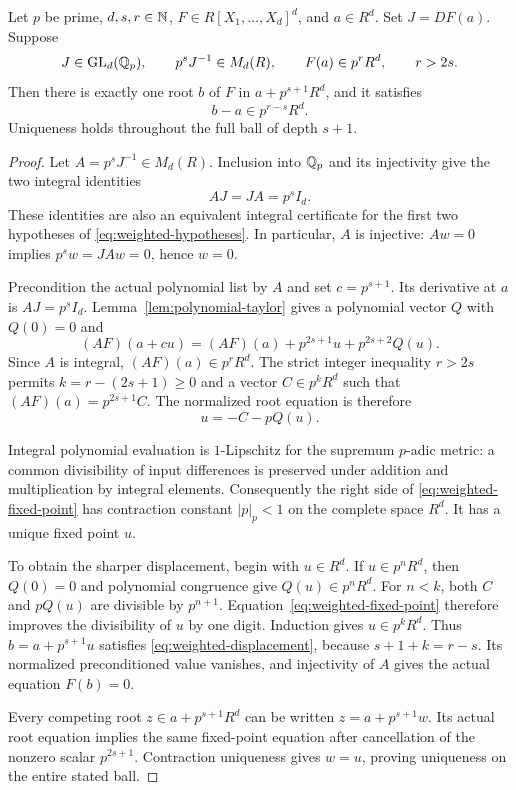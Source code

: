 \begin{theorem}\label{thm:weighted-lifting}
Let $p$ be prime, $d,s,r\in\mathbb N$, $F\in R[X_1,\ldots,X_d]^d$, and
$a\in R^d$. Set $J=DF(a)$. Suppose
\begin{equation}\label{eq:weighted-hypotheses}
 J\in\operatorname{GL}_d(\mathbb Q_p),\qquad
 p^sJ^{-1}\in M_d(R),\qquad F(a)\in p^rR^d,\qquad r>2s.
\end{equation}
Then there is exactly one root $b$ of $F$ in $a+p^{s+1}R^d$, and it
satisfies
\begin{equation}\label{eq:weighted-displacement}
 b-a\in p^{r-s}R^d.
\end{equation}
Uniqueness holds throughout the full ball of depth $s+1$.
\end{theorem}

\begin{proof}
Let $A=p^sJ^{-1}\in M_d(R)$. Inclusion into $\mathbb Q_p$ and its injectivity
give the two integral identities
\[
 AJ=JA=p^sI_d.
\]
These identities are also an equivalent integral certificate for the
first two hypotheses of \eqref{eq:weighted-hypotheses}. In particular,
$A$ is injective: $Aw=0$ implies $p^sw=JAw=0$, hence $w=0$.

Precondition the actual polynomial list by $A$ and set $c=p^{s+1}$.
Its derivative at $a$ is $AJ=p^sI_d$. Lemma~\ref{lem:polynomial-taylor}
gives a polynomial vector $Q$ with $Q(0)=0$ and
\[
 (AF)(a+cu)=(AF)(a)+p^{2s+1}u+p^{2s+2}Q(u).
\]
Since $A$ is integral, $(AF)(a)\in p^rR^d$. The strict integer inequality
$r>2s$ permits $k=r-(2s+1)\ge0$ and a vector $C\in p^kR^d$ such that
$(AF)(a)=p^{2s+1}C$. The normalized root equation is therefore
\begin{equation}\label{eq:weighted-fixed-point}
 u=-C-pQ(u).
\end{equation}

Integral polynomial evaluation is $1$-Lipschitz for the supremum
$p$-adic metric: a common divisibility of input differences is preserved
under addition and multiplication by integral elements. Consequently the
right side of \eqref{eq:weighted-fixed-point} has contraction constant
$|p|_p<1$ on the complete space $R^d$. It has a unique fixed point $u$.

To obtain the sharper displacement, begin with $u\in R^d$. If
$u\in p^nR^d$, then $Q(0)=0$ and polynomial congruence give
$Q(u)\in p^nR^d$. For $n<k$, both $C$ and $pQ(u)$ are divisible by
$p^{n+1}$. Equation~\eqref{eq:weighted-fixed-point} therefore improves
the divisibility of $u$ by one digit. Induction gives $u\in p^kR^d$.
Thus $b=a+p^{s+1}u$ satisfies \eqref{eq:weighted-displacement}, because
$s+1+k=r-s$. Its normalized preconditioned value vanishes, and injectivity
of $A$ gives the actual equation $F(b)=0$.

Every competing root $z\in a+p^{s+1}R^d$ can be written
$z=a+p^{s+1}w$. Its actual root equation implies the same fixed-point
equation after cancellation of the nonzero scalar $p^{2s+1}$.
Contraction uniqueness gives $w=u$, proving uniqueness on the entire
stated ball.
\end{proof}

